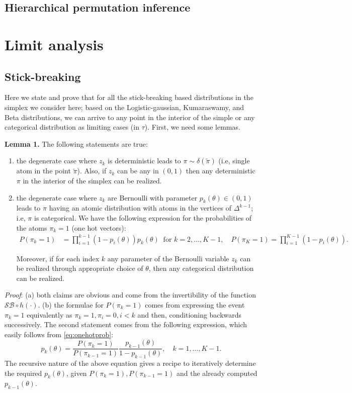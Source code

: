 \label{sec:vae}

\subsection{Hierarchical permutation inference}
\label{sec:synth_celegans}





\appendix
\section{Limit analysis}
\subsection{Stick-breaking}
Here we state and prove that for all the stick-breaking based distributions in the simplex we consider here; based on the Logistic-gaussian, Kumaraswamy, and Beta distributions, we can arrive to any point in the interior of the simple or any categorical distribution as limiting cases (in $\tau$). First, we need some lemmas.


\textbf{Lemma 1.}  The following statements are true:
\begin{enumerate} \item the degenerate case where  $z_k$ is deterministic leads to $\pi\sim \delta(\tilde{\pi})$  (i.e, single atom in the point $\tilde{\pi}$). Also, if $z_k$ can be any in $(0,1)$ then any deterministic $\pi$ in the interior of the simplex can be realized.
\item the degenerate case where  $z_k$ are Bernoulli with parameter $p_k(\theta) \in (0,1)$ leads to $\pi$ having an atomic distribution with atoms in the vertices of $\Delta^{k-1}$; i.e, $\pi$ is categorical. We have the following expression for the probabilities of the atoms $\pi_k=1$ (one hot vectors):
\begin{align}
\label{eq:onehotprob}
P(\pi_k =1)&= \prod_{i=1}^{k-1} (1-p_i(\theta)) p_k(\theta)  \;\; \text{for } k=2, \ldots, K-1, \quad P(\pi_K =1) = \prod_{i=1}^{K-1} (1-p_i(\theta)).
\end{align}

Moreover, if for each index $k$ any parameter of the Bernoulli variable $z_k$ can be realized through appropriate choice of $\theta$, then any categorical distribution can be realized.

\end{enumerate}
\textit{Proof}: (a) both claims are obvious and come from the invertibility of the function $\mathcal{SB} \circ h (\cdot)$. (b) the formulae for $P(\pi_k =1)$ comes from expressing the event $\pi_k=1$ equivalently as $\pi_k=1,\pi_i=0, i<k$ and then, conditioning backwards successively. The second statement comes from the following expression, which easily follows  from \eqref{eq:onehotprob}:
$$ p_k(\theta)=\frac{P(\pi_k =1)}{P(\pi_{k-1} =1)}\frac{p_{k-1}(\theta)}{1-p_{k-1}(\theta)},\quad k =1,\ldots, K-1.$$
The recursive nature of the above equation gives a recipe to iteratively determine the required $p_k(\theta)$, given  $P(\pi_k =1), P(\pi_{k-1} =1)$ and the already computed $p_{k-1}(\theta)$.


